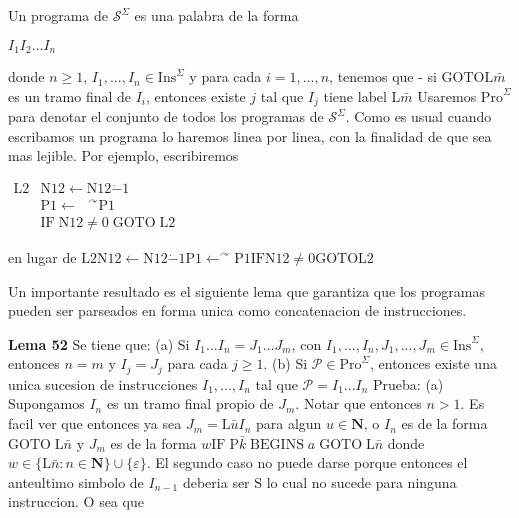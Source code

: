 Un programa de \(\mathcal{S}^{\Sigma }\) es una palabra de la forma

\(\displaystyle I_{1}I_{2}...I_{n} \)

donde \(n\geq 1\), \(I_{1},...,I_{n}\in \mathrm{Ins}^{\Sigma }\) y para cada \( i=1,...,n\), tenemos que
- si \(\mathrm{GOTOL}\bar{m}\) es un tramo final de \(I_{i}\), entonces existe \(j\) tal que \(I_{j}\) tiene label \(\mathrm{L}\bar{m}\)
Usaremos \(\mathrm{Pro}^{\Sigma }\) para denotar el conjunto de todos los programas de \(\mathcal{S}^{\Sigma }\). Como es usual cuando escribamos un programa lo haremos linea por linea, con la finalidad de que sea mas lejible. Por ejemplo, escribiremos

\(\displaystyle \begin{array}{ll} \mathrm{L}2 & \mathrm{N}12\leftarrow \mathrm{N}12\dot{-}1 \\ & \mathrm{P}1\leftarrow \text{ }^{\curvearrowright }\mathrm{P}1 \\ & \mathrm{IF\;N}12\neq 0\;\mathrm{GOTO}\;\mathrm{L}2 \end{array} \)

en lugar de
\(\displaystyle \mathrm{L}2\mathrm{N}12\mathrm{\leftarrow }\text{N}12\mathrm{\dot{-}}1 \mathrm{P}1\mathrm{\leftarrow }^{\curvearrowright }\mathrm{P}1\mathrm{IFN}12 \mathrm{\neq }0\mathrm{GOTOL}2 \)

Un importante resultado es el siguiente lema que garantiza que los programas pueden ser parseados en forma unica como concatenacion de instrucciones.




\textbf{Lema 52} Se tiene que:
(a) Si \(I_{1}...I_{n}=J_{1}...J_{m}\), con \( I_{1},...,I_{n},J_{1},...,J_{m}\in \mathrm{Ins}^{\Sigma }\), entonces \(n=m\) y \(I_{j}=J_{j}\) para cada \(j\geq 1\).
(b) Si \(\mathcal{P}\in \mathrm{Pro}^{\Sigma }\), entonces existe una unica sucesion de instrucciones \(I_{1},...,I_{n}\) tal que \(\mathcal{P} =I_{1}...I_{n}\)
Prueba: (a) Supongamos \(I_{n}\) es un tramo final propio de \(J_{m}.\) Notar que entonces \(n >1\). Es facil ver que entonces ya sea \(J_{m}=\mathrm{L}\bar{u} I_{n}\) para algun \(u\in \mathbf{N}\), o \(I_{n}\) es de la forma \(\mathrm{GOTO} \;\mathrm{L}\bar{n}\) y \(J_{m}\) es de la forma \(w\mathrm{IF}\;\mathrm{P}\bar{k }\;\mathrm{BEGINS}\;a\;\mathrm{GOTO}\;\mathrm{L}\bar{n}\) donde \(w\in \{ \mathrm{L}\bar{n}:n\in \mathbf{N}\}\cup \{\varepsilon \}\). El segundo caso no puede darse porque entonces el anteultimo simbolo de \(I_{n-1}\) deberia ser \(\mathrm{S}\) lo cual no sucede para ninguna instruccion. O sea que

